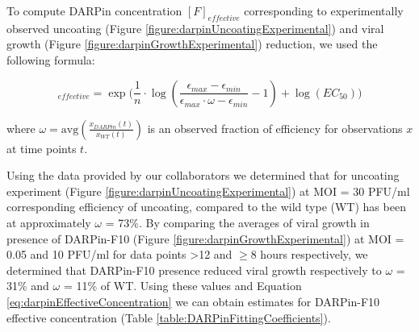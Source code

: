 To compute DARPin concentration $[F]_{effective}$ corresponding to experimentally observed uncoating (Figure \ref{figure:darpinUncoatingExperimental}) and viral growth (Figure \ref{figure:darpinGrowthExperimental}) reduction, we used the following formula:

\begin{equation}
[F]_{effective} = \exp\big( \frac{1}{n}\cdot\log( \frac{\epsilon_{max}-\epsilon_{min}}{\epsilon_{max}\cdot\omega - \epsilon_{min}} - 1 ) +\log(EC_{50}) \big)
\label{eq:darpinEffectiveConcentration}
\end{equation}

where $\omega = \text{avg}(\frac{x_{DARPin}(t)}{x_{WT}(t)})$ is an observed fraction of efficiency for observations $x$ at time points $t$.

Using the data \cite{DarpinData} provided by our collaborators we determined that for uncoating experiment (Figure \ref{figure:darpinUncoatingExperimental}) at MOI = 30 PFU/ml corresponding efficiency of uncoating, compared to the wild type (WT) has been at approximately $\omega$ = 73\%. By comparing the averages of viral growth in presence of DARPin-F10 (Figure \ref{figure:darpinGrowthExperimental}) at MOI = 0.05 and 10 PFU/ml for data points >12 and $\ge$8 hours respectively, we determined that DARPin-F10 presence reduced viral growth respectively to $\omega$ = 31\% and $\omega$ = 11\% of WT. Using these values and Equation \ref{eq:darpinEffectiveConcentration} we can obtain estimates for DARPin-F10 effective concentration (Table \ref{table:DARPinFittingCoefficients}).

